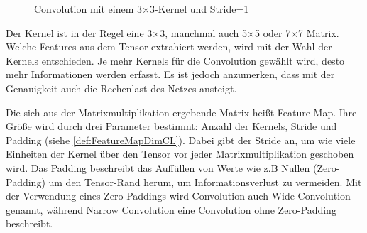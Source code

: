 \begin{figure}[H]
 \caption{Convolution mit einem 3$\times$3-Kernel und Stride=1}
  \label{pic:convolution}
\end{figure}


Der Kernel ist in der Regel eine 3$\times$3, manchmal auch 5$\times$5 oder 7$\times$7 Matrix. Welche Features aus dem Tensor extrahiert werden, wird mit der Wahl der Kernels entschieden. Je mehr Kernels für die Convolution gewählt wird, desto mehr Informationen werden erfasst. Es ist jedoch anzumerken, dass mit der Genauigkeit auch die Rechenlast des Netzes ansteigt.


Die sich aus der Matrixmultiplikation ergebende Matrix heißt Feature Map. Ihre Größe wird durch drei Parameter bestimmt: Anzahl der Kernels, Stride und Padding (siehe \ref{def:FeatureMapDimCL}). Dabei gibt der Stride an, um wie viele Einheiten der Kernel über den Tensor vor jeder Matrixmultiplikation geschoben wird. Das Padding beschreibt das Auffüllen von Werte wie z.B Nullen (Zero-Padding) um den Tensor-Rand herum, um Informationsverlust zu vermeiden. Mit der Verwendung eines Zero-Paddings wird Convolution auch Wide Convolution genannt, während Narrow Convolution eine Convolution ohne Zero-Padding beschreibt.

